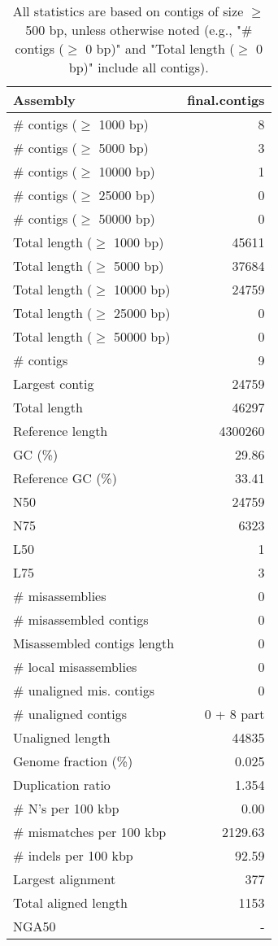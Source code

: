 \documentclass[12pt,a4paper]{article}
\begin{document}
\begin{table}[ht]
\begin{center}
\caption{All statistics are based on contigs of size $\geq$ 500 bp, unless otherwise noted (e.g., "\# contigs ($\geq$ 0 bp)" and "Total length ($\geq$ 0 bp)" include all contigs).}
\begin{tabular}{|l*{1}{|r}|}
\hline
Assembly & final.contigs \\ \hline
\# contigs ($\geq$ 1000 bp) & 8 \\ \hline
\# contigs ($\geq$ 5000 bp) & 3 \\ \hline
\# contigs ($\geq$ 10000 bp) & 1 \\ \hline
\# contigs ($\geq$ 25000 bp) & 0 \\ \hline
\# contigs ($\geq$ 50000 bp) & 0 \\ \hline
Total length ($\geq$ 1000 bp) & 45611 \\ \hline
Total length ($\geq$ 5000 bp) & 37684 \\ \hline
Total length ($\geq$ 10000 bp) & 24759 \\ \hline
Total length ($\geq$ 25000 bp) & 0 \\ \hline
Total length ($\geq$ 50000 bp) & 0 \\ \hline
\# contigs & 9 \\ \hline
Largest contig & 24759 \\ \hline
Total length & 46297 \\ \hline
Reference length & 4300260 \\ \hline
GC (\%) & 29.86 \\ \hline
Reference GC (\%) & 33.41 \\ \hline
N50 & 24759 \\ \hline
N75 & 6323 \\ \hline
L50 & 1 \\ \hline
L75 & 3 \\ \hline
\# misassemblies & 0 \\ \hline
\# misassembled contigs & 0 \\ \hline
Misassembled contigs length & 0 \\ \hline
\# local misassemblies & 0 \\ \hline
\# unaligned mis. contigs & 0 \\ \hline
\# unaligned contigs & 0 + 8 part \\ \hline
Unaligned length & 44835 \\ \hline
Genome fraction (\%) & 0.025 \\ \hline
Duplication ratio & 1.354 \\ \hline
\# N's per 100 kbp & 0.00 \\ \hline
\# mismatches per 100 kbp & 2129.63 \\ \hline
\# indels per 100 kbp & 92.59 \\ \hline
Largest alignment & 377 \\ \hline
Total aligned length & 1153 \\ \hline
NGA50 & - \\ \hline
\end{tabular}
\end{center}
\end{table}
\end{document}
